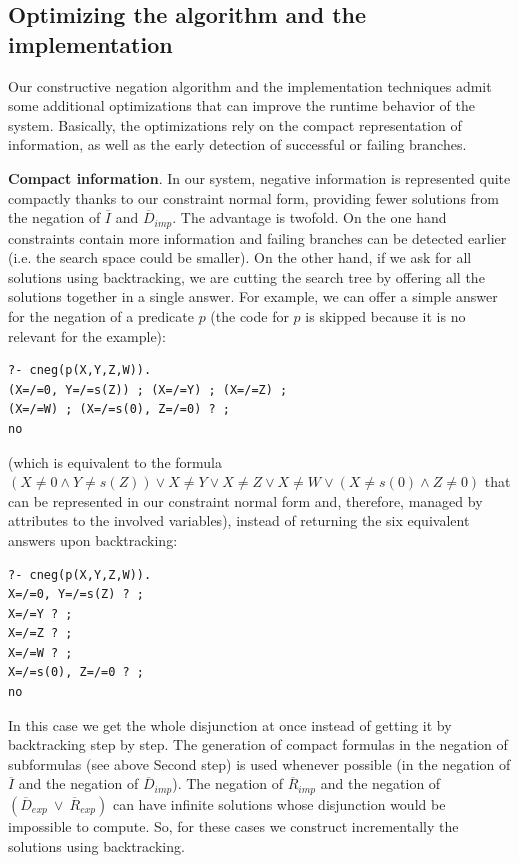 \documentclass{tlp}
\begin{document}

\subsection{Optimizing the algorithm and the implementation}
\label{optimization}

Our constructive negation algorithm and the implementation techniques
admit some additional optimizations that can improve the runtime
behavior of the system. Basically, the optimizations rely on the
compact representation of information, as well as the early detection
of successful or failing branches.
\bigskip

\noindent
{\bf Compact information}. In our system, negative information is
represented quite compactly thanks to our constraint normal form,
providing fewer solutions from the negation of $\overline{I}$ and
$\overline{D}_{imp}$. The advantage is twofold. On the one hand
constraints contain more information and failing branches can be
detected earlier (i.e. the search space could be smaller). On the
other hand, if we ask for all solutions using backtracking, we are
cutting the search tree by offering all the solutions together in a
single answer. For example, we can offer a simple answer for the
negation of a predicate $p$ (the code for $p$ is skipped because it is
no relevant for the example): {
\begin{verbatim}
?- cneg(p(X,Y,Z,W)).
(X=/=0, Y=/=s(Z)) ; (X=/=Y) ; (X=/=Z) ; 
(X=/=W) ; (X=/=s(0), Z=/=0) ? ;
no
\end{verbatim}
}
\noindent
(which is equivalent to the formula $ (X \neq 0 \wedge Y\neq s(Z))
\vee X \neq Y \vee X \neq Z \vee X \neq W \vee (X \neq s(0) \wedge Z
\neq 0)$ that can be represented in our constraint normal form and,
therefore, managed by attributes to the involved variables), instead
of returning the six equivalent answers upon backtracking: {
\begin{verbatim}
?- cneg(p(X,Y,Z,W)).
X=/=0, Y=/=s(Z) ? ;
X=/=Y ? ;
X=/=Z ? ;
X=/=W ? ;
X=/=s(0), Z=/=0 ? ;
no
\end{verbatim}
} 
\noindent
In this case we get the whole disjunction at once instead of getting
it by backtracking step by step. The generation of compact formulas in
the negation of subformulas (see above Second step) is used whenever
possible (in the negation of $\overline{I}$ and the negation of
$\overline{D}_{imp}$). The negation of $\overline{R}_{imp}$ and the
negation of $(\overline{D}_{exp} ~ \vee ~ \overline{R}_{exp})$ can
have infinite solutions whose disjunction would be impossible to
compute. So, for these cases we construct incrementally the solutions
using backtracking.
\bigskip
\end{document}

